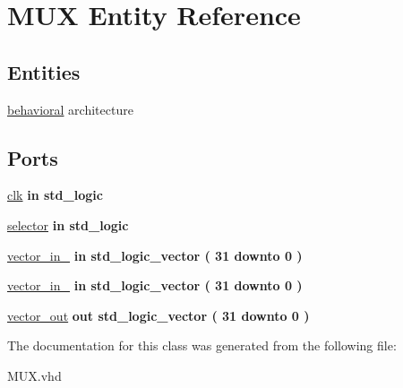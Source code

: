 \hypertarget{class_m_u_x}{\section{\-M\-U\-X \-Entity \-Reference}
\label{class_m_u_x}
}
\subsection*{\-Entities}
\begin{DoxyCompactItemize}
\item 
\hyperlink{class_m_u_x_1_1behavioral}{behavioral} architecture
\end{DoxyCompactItemize}
\*
\*
\subsection*{\-Ports}
 \begin{DoxyCompactItemize}
\item 
\hypertarget{class_m_u_x_a70f7f9ef1e412f6da35c2b9e17540895}{\hyperlink{class_m_u_x_a70f7f9ef1e412f6da35c2b9e17540895}{clk}  {\bfseries {\bfseries in }} {\bfseries std\-\_\-logic } }\label{class_m_u_x_a70f7f9ef1e412f6da35c2b9e17540895}

\item 
\hypertarget{class_m_u_x_a9819d657d3d033c5c4ffe99e31b79bb2}{\hyperlink{class_m_u_x_a9819d657d3d033c5c4ffe99e31b79bb2}{selector}  {\bfseries {\bfseries in }} {\bfseries std\-\_\-logic } }\label{class_m_u_x_a9819d657d3d033c5c4ffe99e31b79bb2}

\item 
\hypertarget{class_m_u_x_adbc4a8307f6b8e70f215db699745f990}{\hyperlink{class_m_u_x_adbc4a8307f6b8e70f215db699745f990}{vector\-\_\-in\-\_}  {\bfseries {\bfseries in }} {\bfseries std\-\_\-logic\-\_\-vector (   31    downto    0  ) } }\label{class_m_u_x_adbc4a8307f6b8e70f215db699745f990}

\item 
\hypertarget{class_m_u_x_aa66f7828cd4605fa3a26337c456221b1}{\hyperlink{class_m_u_x_aa66f7828cd4605fa3a26337c456221b1}{vector\-\_\-in\-\_}  {\bfseries {\bfseries in }} {\bfseries std\-\_\-logic\-\_\-vector (   31    downto    0  ) } }\label{class_m_u_x_aa66f7828cd4605fa3a26337c456221b1}

\item 
\hypertarget{class_m_u_x_aba4981bcab558ff1bfef133843d39d43}{\hyperlink{class_m_u_x_aba4981bcab558ff1bfef133843d39d43}{vector\-\_\-out}  {\bfseries {\bfseries out }} {\bfseries std\-\_\-logic\-\_\-vector (   31    downto    0  ) } }\label{class_m_u_x_aba4981bcab558ff1bfef133843d39d43}

\end{DoxyCompactItemize}


\-The documentation for this class was generated from the following file\-:\begin{DoxyCompactItemize}
\item 
\-M\-U\-X.\-vhd\end{DoxyCompactItemize}
